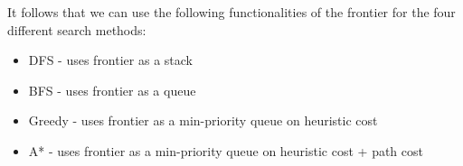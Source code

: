 \documentclass[titlepage]{article}
\begin{document}
\noindent It follows that we can use the following functionalities of the frontier for the four different search methods:
\begin{itemize}
\item DFS - uses frontier as a stack
\item BFS - uses frontier as a queue
\item Greedy - uses frontier as a min-priority queue on heuristic cost
\item A* - uses frontier as a min-priority queue on heuristic cost + path cost
\end{itemize}
\noindent


%
\end{document}
